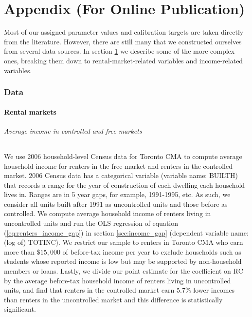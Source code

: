 \documentclass[parskip=full]{article}
\begin{document}
\newpage

\appendix

\maketitle


\part*{Appendix (For Online Publication)}

Most of our assigned parameter values and calibration targets are taken directly from the literature. However, there are still many that we constructed ourselves from several data sources. In section \ref{appendix:data} we describe some of the more complex ones, breaking them down to rental-market-related variables and income-related variables.

\section{Data}\label{appendix:data}

\subsection{Rental markets}

\paragraph{Average income in controlled and free markets}
We use 2006 household-level Census data for Toronto CMA to compute average household income for renters in the free market and renters in the controlled market. 2006 Census data has a categorical variable (variable name: BUILTH) that records a range for the year of construction of each dwelling each household lives in. Ranges are in 5 year gaps, for example, 1991-1995, etc. As such, we consider all units built after 1991 as uncontrolled units and those before as controlled. We compute average household income of renters living in uncontrolled units and run the OLS regression of equation (\ref{eq:renters_income_gap}) in section \ref{sec:income_gap} (dependent variable name: (log of) TOTINC). We restrict our sample to renters in Toronto CMA who earn more than $\$15,000$ of before-tax income per year to exclude households such as students whose reported income is low but may be supported by non-household members or loans. Lastly, we divide our point estimate for the coefficient on $\mbox{RC}$ by the average before-tax household income of renters living in uncontrolled units, and find that renters in the controlled market earn 5.7\% lower incomes than renters in the uncontrolled market and this difference is statistically significant.
\end{document}
